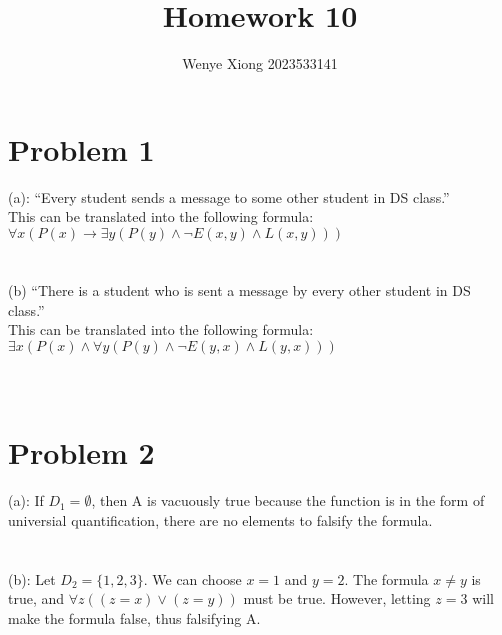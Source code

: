 \documentclass{article}
\author{Wenye Xiong 2023533141}
\title{Homework 10}
\begin{document}
\maketitle
\section{Problem 1}
(a): “Every student sends a message to some other student in DS class.”\\
This can be translated into the following formula:\\
$\forall x (P(x) \rightarrow \exists y (P(y) \wedge \neg E(x,y) \wedge L(x,y)))$\\
\\ \hspace*{\fill} \\
(b) “There is a student who is sent a message by every other student in DS class.”\\
This can be translated into the following formula:\\
$\exists x (P(x) \wedge \forall y (P(y) \wedge \neg E(y,x) \wedge L(y,x)))$\\
\\ \hspace*{\fill} \\
\section{Problem 2}
(a): If $D_1 = \emptyset$, then A is vacuously true because the function is in the form of universial quantification, there are no elements to falsify the formula.\\
\\ \hspace*{\fill} \\
(b): Let $D_2 = \{1,2,3\}$. We can choose $x = 1$ and $y = 2$. The formula $x \neq  y$ is true, and $\forall z ((z = x) \vee (z = y))$ must be true. However, letting $z = 3$ will make the formula false, thus falsifying A.\\
\\ \hspace*{\fill} \\
\end{document}
